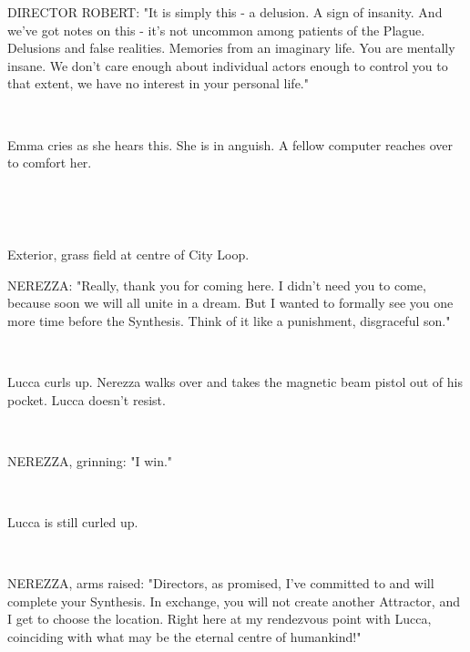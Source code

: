 \documentclass[11pt]{article}
\begin{document}
DIRECTOR ROBERT: "It is simply this - a delusion.
A sign of insanity.
And we've got notes on this - it's not uncommon among patients of the Plague.
Delusions and false realities.
Memories from an imaginary life.
You are mentally insane.
We don't care enough about individual actors enough to control you to that extent, we have no interest in your personal life."

\ 

Emma cries as she hears this. 
She is in anguish.
A fellow computer reaches over to comfort her.

\ 

\ 

Exterior, grass field at centre of City Loop.

NEREZZA: "Really, thank you for coming here.
I didn't need you to come, because soon we will all unite in a dream. 
But I wanted to formally see you one more time before the Synthesis.
Think of it like a punishment, disgraceful son."

\ 

Lucca curls up.
Nerezza walks over and takes the magnetic beam pistol out of his pocket.
Lucca doesn't resist.

\ 

NEREZZA, grinning: "I win."

\ 

Lucca is still curled up.

\ 

NEREZZA, arms raised: "Directors, as promised, I've committed to and will complete your Synthesis.
In exchange, you will not create another Attractor, and I get to choose the location.
Right here at my rendezvous point with Lucca, coinciding with what may be the eternal centre of humankind!"
\end{document}
